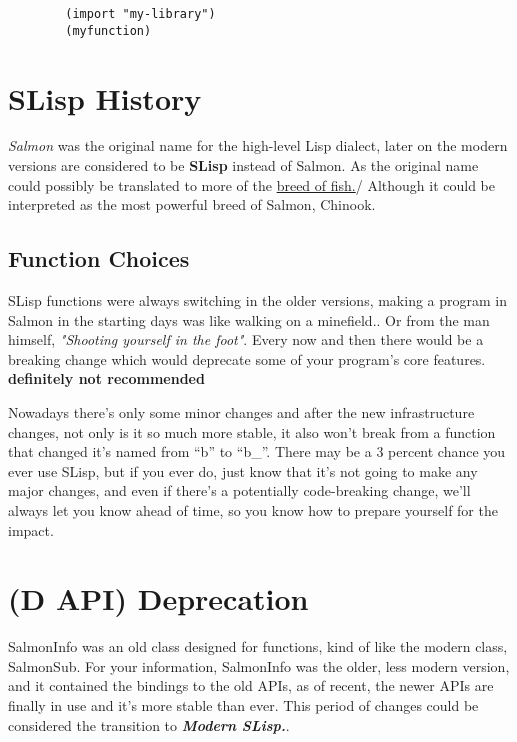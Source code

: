 \documentclass{article}
\begin{document}
	\begin{lstlisting}
		(import "my-library")
		(myfunction)
	\end{lstlisting}

	\newpage
	\section{SLisp History}

	\emph{Salmon} was the original name for the high-level Lisp dialect, later on the
	modern versions are considered to be \textbf{SLisp} instead of Salmon. As the original name could
	possibly be translated to more of the \href{https://wikipedia.org/wiki/Salmon}{breed of fish.}/ Although it could be
	interpreted as the most powerful breed of Salmon, Chinook.

	\subsection{Function Choices}

	SLisp functions were always switching in the older versions, making a program in Salmon in the starting
	days was like walking on a minefield.. Or from the man himself, \emph{"Shooting yourself in the foot"}. Every
	now and then there would be a breaking change which would deprecate some of your program's core features. 
	\textbf{definitely not recommended}

	Nowadays there's only some minor changes and after the new infrastructure changes, not only is it so
	much more stable, it also won't break from a function that changed it's named from ``b'' to ``b\_''. There
	may be a 3 percent chance you ever use SLisp, but if you ever do, just know that it's not going to make any major changes,
	and even if there's a potentially code-breaking change, we'll always let you know ahead of time, 
	so you know how to prepare yourself for the impact.
	
	\newpage

	\section{\textbf{(D API)} Deprecation}

	SalmonInfo was an old class designed for functions, kind of like the modern class, SalmonSub. For your information,
	SalmonInfo was the older, less modern version, and it contained the bindings to the old APIs, as of recent, the newer
	APIs are finally in use and it's more stable than ever. This period of changes could be considered the
	transition to \emph{\textbf{Modern SLisp.}}.
\end{document}
